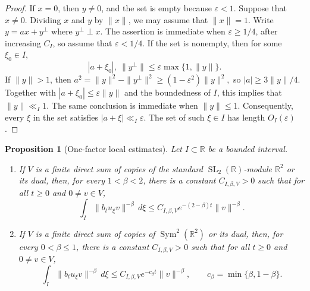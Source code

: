 \documentclass[reqno,11pt]{amsart}
\newtheorem{prop}[prop]{Proposition}
\theoremstyle{definition}
\theoremstyle{remark}
\numberwithin{equation}{section}
\newcommand{\SL}{\operatorname{SL}}
\begin{document}
\begin{proof}
If $x=0$, then $y\ne0$, and the set is empty because
$\varepsilon<1$. Suppose that $x\ne0$. Dividing $x$ and $y$ by
$\|x\|$, we may assume that $\|x\|=1$. Write
$
y=ax+y^\perp$ where
$
y^\perp\perp x.
$
The assertion is immediate when $\varepsilon\ge1/4$, after increasing
$C_I$, so assume that $\varepsilon<1/4$. If the set is nonempty, then for some $\xi_0\in I$,
$$
|a+\xi_0|,\ \|y^\perp\|
\le
\varepsilon\max\{1,\|y\|\}.
$$
If $\|y\|>1$, then
$
a^2
=
\|y\|^2-\|y^\perp\|^2
\ge
(1-\varepsilon^2)\|y\|^2,
$
so $|a|\ge3\|y\|/4$. Together with
$|a+\xi_0|\le\varepsilon\|y\|$ and the boundedness of $I$, this implies
that $\|y\|\ll_I1$. The same conclusion is immediate when $\|y\|\le1$.
Consequently, every $\xi$ in the set satisfies
$|a+\xi|\ll_I\varepsilon$. The set of such $\xi\in I$ has length
$O_I(\varepsilon)$.
\end{proof}

\begin{prop}[One-factor local estimates]
\label{prop:local-contraction-d2}
Let $I\subset\mathbb R$ be a bounded interval.
\begin{enumerate}[label=\textnormal{(\roman*)}]
\item
If $V$ is a finite direct sum of copies of the standard
$\SL_2(\mathbb R)$-module $\mathbb R^2$ or its dual, then, for every
$1<\beta<2$, there is a constant $C_{I,\beta,V}>0$ such that for all $t\ge0$ and $0\ne v\in V$,
$$
\int_I\|b_tu_\xi v\|^{-\beta}\,d\xi
\le
C_{I,\beta,V}e^{-(2-\beta)t}\|v\|^{-\beta}.
$$


\item
If $V$ is a finite direct sum of copies of
$\operatorname{Sym}^2(\mathbb R^2)$ or its dual, then, for every
$0<\beta\le1$, there is a constant $C_{I,\beta,V}>0$ such that for all $t\ge0$ and $0\ne v\in V$,
$$
\int_I\|b_tu_\xi v\|^{-\beta}\,d\xi
\le
C_{I,\beta,V}e^{-c_\beta t}\|v\|^{-\beta},
\qquad
c_\beta=\min\{\beta,1-\beta\}.
$$
\end{enumerate}
\end{prop}
\end{document}
